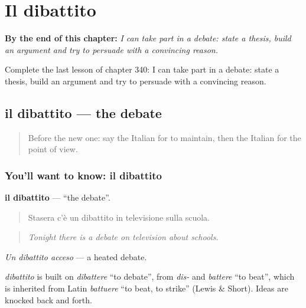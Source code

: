 
\chapter{Il dibattito}
\label{ch:it-il-dibattito}

\begin{chapteropening}
\textbf{By the end of this chapter:} \emph{I can take part in a debate: state a thesis, build an argument and try to persuade with a convincing reason.}

Complete the last lesson of chapter 340: I can take part in a debate: state a thesis, build an argument and try to persuade with a convincing reason.
\end{chapteropening}

\section[il dibattito]{il dibattito — the debate}

\label{lesson:IT-C340-dibattito}



\begin{quote}
Before the new one: say the Italian for to maintain, then the Italian for the point of view.
\end{quote}

\subsection*{You'll want to know: il dibattito}
\textbf{il dibattito} — \textquotedblleft{}the debate\textquotedblright{}.

\begin{quote}
Stasera c'è un dibattito in televisione sulla scuola.
\end{quote}

\begin{quote}
\emph{Tonight there is a debate on television about schools.}
\end{quote}

\emph{Un dibattito acceso} — a heated debate.

\begin{cousinweb}
\emph{dibattito} is built on \emph{dibattere} \textquotedblleft{}to debate\textquotedblright{}, from \emph{dis-} and \emph{battere} \textquotedblleft{}to beat\textquotedblright{}, which is inherited from Latin \emph{battuere} \textquotedblleft{}to beat, to strike\textquotedblright{} (Lewis \& Short). Ideas are knocked back and forth.
\end{cousinweb}

